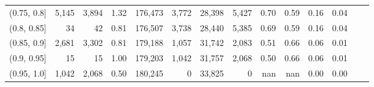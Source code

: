\begin{tabular}{rrrrrrrrrrrrrr}
(0.75, 0.8]    &   5,145 &  3,894 &   1.32 &  176,473 &    3,772 &  28,398 &   5,427 &  0.70 &  0.59 &  0.16 &      0.04 \\
(0.8, 0.85]    &      34 &     42 &   0.81 &  176,507 &    3,738 &  28,440 &   5,385 &  0.69 &  0.59 &  0.16 &      0.04 \\
(0.85, 0.9]    &   2,681 &  3,302 &   0.81 &  179,188 &    1,057 &  31,742 &   2,083 &  0.51 &  0.66 &  0.06 &      0.01 \\
(0.9, 0.95]    &      15 &     15 &   1.00 &  179,203 &    1,042 &  31,757 &   2,068 &  0.50 &  0.66 &  0.06 &      0.01 \\
(0.95, 1.0]    &   1,042 &  2,068 &   0.50 &  180,245 &        0 &  33,825 &       0 &   nan &   nan &  0.00 &      0.00 \\
\bottomrule
\end{tabular}
